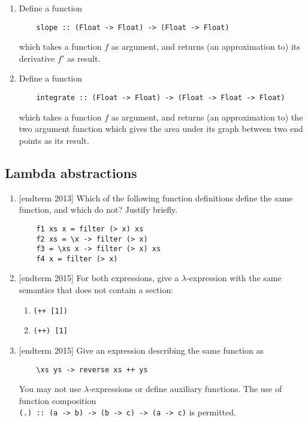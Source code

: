 \documentclass{article}
\begin{document}
\begin{enumerate}
\item \cite[p. 252]{thompson} Define a function
\begin{verbatim}
    slope :: (Float -> Float) -> (Float -> Float)
\end{verbatim}
which takes a function $f$ as argument, and returns (an approximation to) its derivative $f'$ as result.

\item \cite[p. 252]{thompson} Define a function
\begin{verbatim}
    integrate :: (Float -> Float) -> (Float -> Float -> Float)
\end{verbatim}
which takes a function $f$ as argument, and returns (an approximation to) the two argument function which gives the area under its graph between two end points as its result.
\end{enumerate}

\subsection{Lambda abstractions}
\begin{enumerate}
\item {[endterm 2013]} Which of the following function definitions define the same function, and which do not? Justify briefly.
\begin{verbatim}
    f1 xs x = filter (> x) xs
    f2 xs = \x -> filter (> x)
    f3 = \xs x -> filter (> x) xs
    f4 x = filter (> x)
\end{verbatim}

\item {[endterm 2015]} For both expressions, give a $\lambda$-expression with the same semantics that does not contain a section:
\begin{enumerate}
\item \verb|(++ [1])|
\item \verb|(++) [1]|
\end{enumerate}

\item {[endterm 2015]} Give an expression describing the same function as
\begin{verbatim}
    \xs ys -> reverse xs ++ ys
\end{verbatim}
You may not use $\lambda$-expressions or define auxiliary functions. The use of function composition \\ \verb|(.) :: (a -> b) -> (b -> c) -> (a -> c)| is permitted.
\end{enumerate}
\end{document}
